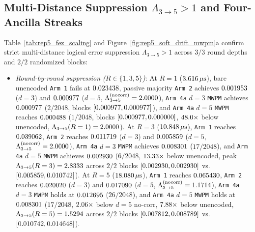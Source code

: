 \documentclass[aps,prx,twocolumn,superscriptaddress,nofootinbib]{revtex4-2}
\begin{document}
\subsection{Multi-Distance Suppression $\Lambda_{3\to 5} > 1$ and Four-Ancilla Streaks}
Table~\ref{tab:rep5_fez_scaling} and Figure~\ref{fig:rep5_soft_drift_mwpm}a confirm strict multi-distance logical error suppression $\Lambda_{3\to 5} > 1$ across $3/3$ round depths and $2/2$ randomized blocks:
\begin{itemize}
  \item \emph{Round-by-round suppression ($R \in \{1, 3, 5\}$)}: At $R = 1$ ($3.616\,\mu\mathrm{s}$), bare unencoded \texttt{Arm 1} fails at $0.023438$, passive majority \texttt{Arm 2} achieves $0.001953$ ($d=3$) and $0.000977$ ($d=5$, $\Lambda_{3\to 5}^{(\mathrm{nocorr})} = 2.0000$), \texttt{Arm 4a} $d=3$ \texttt{MWPM} achieves $0.000977$ ($2/2048$, blocks $[0.000977, 0.000977]$), and \texttt{Arm 4a} $d=5$ \texttt{MWPM} reaches $0.000488$ ($1/2048$, blocks $[0.000977, 0.000000]$, $48.0\times$ below unencoded, $\Lambda_{3\to 5}(R=1) = 2.0000$). At $R = 3$ ($10.848\,\mu\mathrm{s}$), \texttt{Arm 1} reaches $0.039062$, \texttt{Arm 2} reaches $0.011719$ ($d=3$) and $0.005859$ ($d=5$, $\Lambda_{3\to 5}^{(\mathrm{nocorr})} = 2.0000$), \texttt{Arm 4a} $d=3$ \texttt{MWPM} achieves $0.008301$ ($17/2048$), and \texttt{Arm 4a} $d=5$ \texttt{MWPM} achieves $0.002930$ ($6/2048$, $13.33\times$ below unencoded, peak $\Lambda_{3\to 5}(R=3) = 2.8333$ across $2/2$ blocks $[0.002930, 0.002930]$ vs.\ $[0.005859, 0.010742]$). At $R = 5$ ($18.080\,\mu\mathrm{s}$), \texttt{Arm 1} reaches $0.065430$, \texttt{Arm 2} reaches $0.020020$ ($d=3$) and $0.017090$ ($d=5$, $\Lambda_{3\to 5}^{(\mathrm{nocorr})} = 1.1714$), \texttt{Arm 4a} $d=3$ \texttt{MWPM} holds at $0.012695$ ($26/2048$), and \texttt{Arm 4a} $d=5$ \texttt{MWPM} holds at $0.008301$ ($17/2048$, $2.06\times$ below $d=5$ no-corr, $7.88\times$ below unencoded, $\Lambda_{3\to 5}(R=5) = 1.5294$ across $2/2$ blocks $[0.007812, 0.008789]$ vs.\ $[0.010742, 0.014648]$).

\end{itemize}
\end{document}
